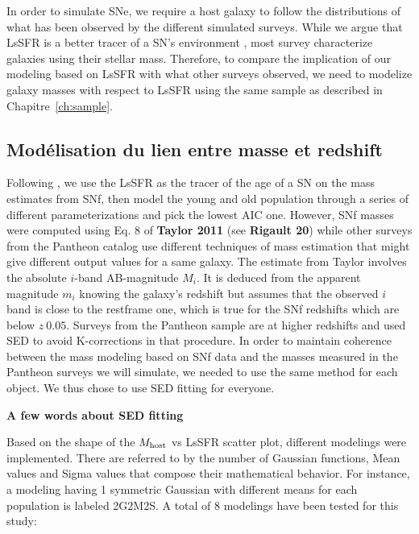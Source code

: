 \documentclass[../main/main.tex]{subfiles}
\begin{document}
In order to simulate SNe, we require a host galaxy to follow the distributions
of what has been observed by the different simulated surveys. While we argue
that LsSFR is a better tracer of a SN's environment \citep{briday2021}, most
survey characterize galaxies using their stellar mass. Therefore, to compare the
implication of our modeling based on LsSFR with what other surveys observed, we
need to modelize galaxy masses with respect to LsSFR using the same sample as
described in Chapitre~\ref{ch:sample}.

\subsection{Modélisation du lien entre masse et redshift}\label{ssec:mmod}

Following \cite{nicolas2021}, we use the LsSFR as the tracer of the age of a SN on
the mass estimates from SNf, then model the young and old population through a
series of different parameterizations and pick the lowest AIC one. However, SNf
masses were computed using Eq. 8 of \textbf{Taylor 2011} (see \textbf{Rigault
20}) while other surveys from the Pantheon catalog use different techniques of
mass estimation that might give different output values for a same galaxy. The
estimate from Taylor involves the absolute $i$-band AB-magnitude $M_i$. It is
deduced from the apparent magnitude $m_i$ knowing the galaxy's redshift but
assumes that the observed $i$ band is close to the restframe one, which is true
for the SNf redshifts which are below $z~0.05$. Surveys from the Pantheon sample
are at higher redshifts and used SED to avoid K-corrections in that procedure.
In order to maintain coherence between the mass modeling based on SNf data and
the masses measured in the Pantheon surveys we will simulate, we needed to use
the same method for each object. We thus chose to use SED fitting for everyone.

\textbf{A few words about SED fitting}

Based on the shape of the $M_{\rm host}$ vs LsSFR scatter plot, different
modelings were implemented. There are referred to by the number of Gaussian
functions, Mean values and Sigma values that compose their mathematical
behavior. For instance, a modeling having 1 symmetric Gaussian with different
means for each population is labeled 2G2M2S. A total of 8 modelings have been
tested for this study:
\end{document}
